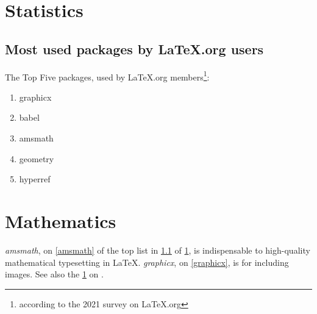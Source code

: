 \documentclass{book}
\begin{document}
\chapter{Statistics}
\label{stats}
\section{Most used packages by LaTeX.org users}
\label{packages}
The Top Five packages, used by LaTeX.org
members\footnote{according to the 2021 survey on
LaTeX.org\label{project}}:
\begin{enumerate}
  \item graphicx\label{graphicx}
  \item babel
  \item amsmath\label{amsmath}
  \item geometry
  \item hyperref
\end{enumerate}
\chapter{Mathematics}
\label{maths}
\emph{amsmath}, on \cref{amsmath} of the top list in 
\cref{packages} of \cref{stats}, is indispensable to
high-quality mathematical typesetting in \LaTeX.
\emph{graphicx}, on \cref{graphicx}, is for including images.
See also the \cref{project} on .
\end{document}
